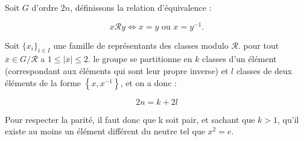 Soit $G$ d'ordre $2n$, définissons la relation d'équivalence :

\[x \mathcal{R} y \Leftrightarrow x=y \text{ ou } x = y^{-1}.\]

Soit $\{x_i\}_{i\in I}$ une famille de représentants des classes modulo $\mathcal{R}$.
pour tout $\overline{x} \in G/\mathcal{R}$ a $1 \leq | \overline{x} | \leq 2$. le groupe se partitionne en $k$ classes d'un élément (correspondant aux éléments qui sont leur propre inverse) et $l$ classes de deux éléments de la forme $\left\{x, x^{-1}\right\}$, et on a donc :

\[2n = k + 2l\]

Pour respecter la parité, il faut donc que k soit pair, et sachant que $k>1$, qu'il existe au moins un élément différent du neutre tel que $x^2=e$.